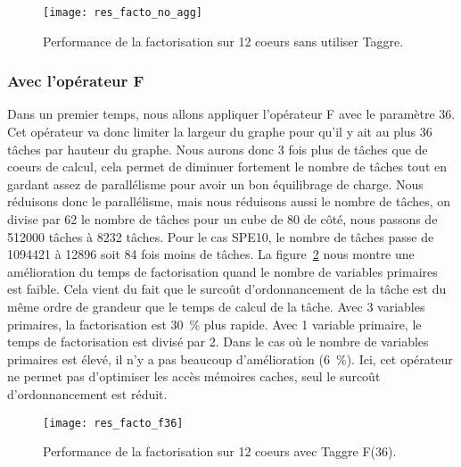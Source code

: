 \begin{figure}[!h]
  \centering
  \texttt{[image: res\_facto\_no\_agg]}
  \caption{Performance de la factorisation sur 12 coeurs sans utiliser Taggre.}
  \label{fig:res_facto_no_agg}
\end{figure}


\subsubsection{Avec l'opérateur F}
Dans un premier temps, nous allons appliquer l'opérateur F avec le paramètre 36.
%
Cet opérateur va donc limiter la largeur du graphe pour qu'il y ait au plus 36 tâches par hauteur du graphe.
%
Nous aurons donc 3 fois plus de tâches que de coeurs de calcul, cela permet de diminuer fortement le nombre de tâches tout en gardant assez de parallélisme pour avoir un bon équilibrage de charge.
%
Nous réduisons donc le parallélisme, mais nous réduisons aussi le nombre de tâches, on divise par 62 le nombre de tâches pour un cube de 80 de côté, nous passons de 512000 tâches à 8232 tâches.
%
Pour le cas SPE10, le nombre de tâches passe de 1094421 à 12896 soit 84 fois moins de tâches.
%
La figure~\ref{fig:res_facto_f36} nous montre une amélioration du temps de factorisation quand le nombre de variables primaires est faible.
%
Cela vient du fait que le surcoût d'ordonnancement de la tâche est du même ordre de grandeur que le temps de calcul de la tâche.
%
Avec 3 variables primaires, la factorisation est 30~\% plus rapide.
%
Avec 1 variable primaire, le temps de factorisation est divisé par 2.
%
Dans le cas où le nombre de variables primaires est élevé, il n'y a pas beaucoup d'amélioration (6~\%).
%
Ici, cet opérateur ne permet pas d'optimiser les accès mémoires caches, seul le surcoût d'ordonnancement est réduit.

\begin{figure}[!h]
  \centering
  \texttt{[image: res\_facto\_f36]}
  \caption{Performance de la factorisation sur 12 coeurs avec Taggre F(36).}
  \label{fig:res_facto_f36}
\end{figure}


